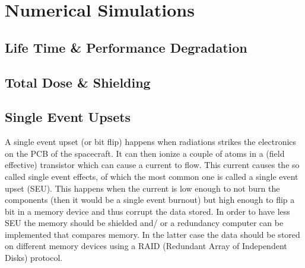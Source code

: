 
\section{\label{sec:simulations}Numerical Simulations}

\subsection{\label{subsec:life}Life Time \& Performance Degradation}


\subsection{\label{subsec:shield}Total Dose \& Shielding}


\subsection{\label{subsec:SEU}Single Event Upsets}
A single event upset (or bit flip) happens when radiations strikes the electronics on the PCB of the spacecraft. It can then ionize a couple of atoms in a (field effective) transistor which can cause a current to flow. This current causes the so called single event effects, of which the most common one is called a single event upset (SEU). This happens when the current is low enough to not burn the components (then it would be a single event burnout) but high enough to flip a bit in a memory device and thus corrupt the data stored. In order to have less SEU the memory should be shielded and/ or a redundancy computer can be implemented that compares memory. In the latter case the data should be stored on different memory devices using a RAID (Redundant Array of Independent Disks) protocol.\\


